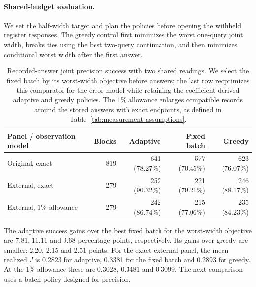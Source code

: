 \paragraph{Shared-budget evaluation.}
We set the half-width target and plan the policies before opening the
withheld register responses.
The greedy control first minimizes the worst one-query joint width, breaks
ties using the best two-query continuation, and then minimizes conditional
worst width after the first answer.

\begin{table}[t]
\centering\small
\begin{tabular}{lrrrr}
\toprule
Panel / observation model & Blocks & Adaptive & Fixed batch & Greedy\\
\midrule
Original, exact &819&641 (78.27\%)&577 (70.45\%)&623 (76.07\%)\\
External, exact &279&252 (90.32\%)&221 (79.21\%)&246 (88.17\%)\\
External, $1\%$ allowance &279&242 (86.74\%)&215 (77.06\%)&235 (84.23\%)\\
\bottomrule
\end{tabular}
\caption{Recorded-answer joint precision success with two shared readings.
We select the fixed batch by its worst-width objective before answers;
the last row reoptimizes this comparator for the error model while retaining
the coefficient-derived adaptive and greedy policies. The $1\%$ allowance
enlarges compatible records around the stored answers with exact endpoints,
as defined in Table~\ref{tab:measurement-assumptions}.}
\label{tab:joint_shared_replay}
\end{table}

The adaptive success gains over the best fixed batch for the worst-width objective are
7.81, 11.11 and 9.68 percentage points, respectively. Its gains over greedy
are smaller: 2.20, 2.15 and 2.51 points. For the exact external panel, the
mean realized $J$ is 0.2823 for adaptive, 0.3381 for the fixed batch and
0.2893 for greedy. At the $1\%$ allowance these are 0.3028, 0.3481 and
0.3099. The next comparison uses a batch policy designed for precision.


